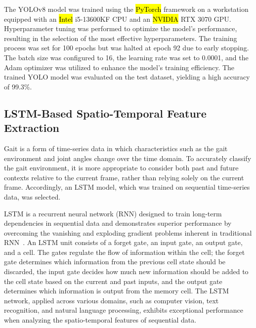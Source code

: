 \documentclass[actuators,article,accept,pdftex,moreauthors]{Definitions/mdpi}
\begin{document}
The YOLOv8 model was trained using the \hl{PyTorch} framework on a workstation equipped with an \hl{Intel} i5-13600KF CPU and an \hl{NVIDIA} RTX 3070 GPU. Hyperparameter tuning was performed to optimize the model's performance, resulting in the selection of the most effective hyperparameters. The training process was set for 100 epochs but was halted at epoch 92 due to early stopping. The batch size was configured to 16, the learning rate was set to 0.0001, and the Adam optimizer was utilized to enhance the model’s training efficiency. The trained YOLO model was evaluated on the test dataset, yielding a high accuracy of 99.3\%. %

\subsection{{LSTM-Based Spatio-Temporal Feature Extraction}}
Gait is a form of time-series data in which characteristics such as the gait environment and joint angles change over the time domain. To accurately classify the gait environment, it is more appropriate to consider both past and future contexts relative to the current frame, rather than relying solely on the current frame. Accordingly, an LSTM model, which was trained on sequential time-series data, was selected.

LSTM is a recurrent neural network{ (RNN)} designed to train long-term dependencies in sequential data and demonstrates superior performance by overcoming the vanishing and exploding gradient problems inherent in traditional RNN~\cite{Graves2012}. An LSTM unit consists of a forget gate, an input gate, an output gate, and a cell. The gates regulate the flow of information within the cell; the forget gate determines which information from the previous cell state should be discarded, the input gate decides how much new information should be added to the cell state based on the current and past inputs, and the output gate determines which information is output from the memory cell. The LSTM network, applied across various domains, such as computer vision, text recognition, and natural language processing, exhibits exceptional performance when analyzing the spatio-temporal features of sequential data.
\end{document}
